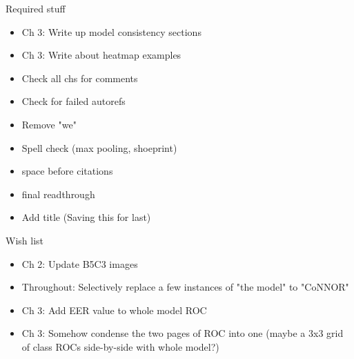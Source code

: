 
Required stuff

\begin{itemize}

\item Ch 3: Write up model consistency sections
\item Ch 3: Write about heatmap examples
\item Check all chs for comments
\item Check for failed autorefs
\item Remove "we"
\item Spell check (max pooling, shoeprint)
\item space before citations
\item final readthrough
\item Add title (Saving this for last)
\end{itemize}



Wish list

\begin{itemize}
\item Ch 2: Update B5C3 images
\item Throughout: Selectively replace a few instances of "the model" to "CoNNOR"
\item Ch 3: Add EER value to whole model ROC
\item Ch 3: Somehow condense the two pages of ROC into one (maybe a 3x3 grid of class ROCs side-by-side with whole model?)
\end{itemize}



